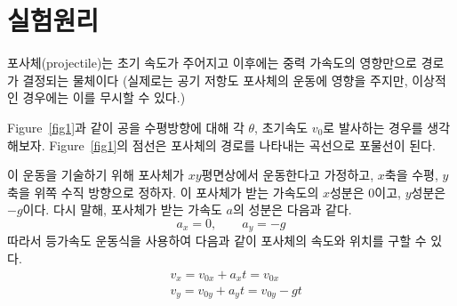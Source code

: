 \documentclass[12pt,a4paper]{article}
\begin{document}
\section{실험원리}
포사체(projectile)는 초기 속도가 주어지고 이후에는 중력 가속도의 영향만으로 경로가 결정되는
물체이다 (실제로는 공기 저항도 포사체의 운동에 영향을 주지만, 이상적인 경우에는 이를 무시할 수 있다.)

Figure~\ref{fig1}과 같이 공을 수평방향에 대해 각 $\theta$, 초기속도 $v_{0}$로 발사하는 경우를 생각해보자.
Figure~\ref{fig1}의 점선은 포사체의 경로를 나타내는 곡선으로 포물선이 된다.

이 운동을 기술하기 위해 포사체가 $xy$평면상에서 운동한다고 가정하고, $x$축을 수평, $y$축을 위쪽
수직 방향으로 정하자. 이 포사체가 받는 가속도의 $x$성분은 $0$이고, $y$성분은 $-g$이다.
다시 말해, 포사체가 받는 가속도 $a$의 성분은 다음과 같다.
\begin{equation}
    a_{x} = 0, \quad\quad a_{y} = -g
\end{equation}
따라서 등가속도 운동식을 사용하여 다음과 같이 포사체의 속도와 위치를 구할 수 있다.
\begin{equation}
    \begin{aligned}
        &v_{x} = v_{0x} + a_{x}t=v_{0x} \\
        &v_{y} = v_{0y} + a_{y}t=v_{0y} - gt
        \label{eq2}
    \end{aligned}
\end{equation}
\end{document}
